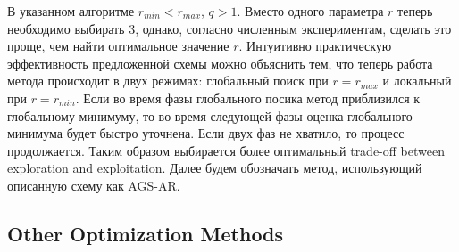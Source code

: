 \documentclass[runningheads]{llncs}
\begin{document}
В указанном алгоритме $r_{min} < r_{max}$, $q > 1$. Вместо одного параметра $r$ теперь
необходимо выбирать 3, однако, согласно численным экспериментам, сделать это проще, чем найти оптимальное значение $r$.
Интуитивно практическую эффективность предложенной схемы можно объяснить тем, что теперь работа метода происходит в
двух режимах: глобальный поиск при $r=r_{max}$ и локальный при $r=r_{min}$. Если во время фазы глобального посика
метод приблизился к глобальному минимуму, то во время следующей фазы оценка глобального минимума будет быстро уточнена.
Если двух фаз не хватило, то процесс продолжается. Таким образом выбирается более оптимальный trade-off between
exploration and exploitation. Далее будем обозначать метод, использующий описанную схему как AGS-AR.

\subsection{Other Optimization Methods}
\end{document}
